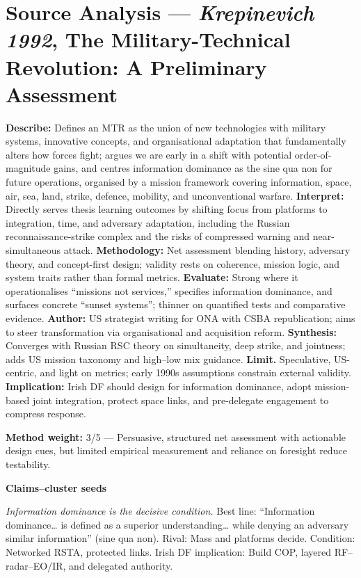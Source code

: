 \section*{Source Analysis — \textit{Krepinevich 1992}, The Military-Technical Revolution: A Preliminary Assessment}
\textbf{Describe:} Defines an MTR as the union of new technologies with military systems, innovative concepts, and organisational adaptation that fundamentally alters how forces fight; argues we are early in a shift with potential order-of-magnitude gains, and centres information dominance as the sine qua non for future operations, organised by a mission framework covering information, space, air, sea, land, strike, defence, mobility, and unconventional warfare.
\textbf{Interpret:} Directly serves thesis learning outcomes by shifting focus from platforms to integration, time, and adversary adaptation, including the Russian reconnaissance-strike complex and the risks of compressed warning and near-simultaneous attack.
\textbf{Methodology:} Net assessment blending history, adversary theory, and concept-first design; validity rests on coherence, mission logic, and system traits rather than formal metrics.
\textbf{Evaluate:} Strong where it operationalises “missions not services,” specifies information dominance, and surfaces concrete “sunset systems”; thinner on quantified tests and comparative evidence.
\textbf{Author:} US strategist writing for ONA with CSBA republication; aims to steer transformation via organisational and acquisition reform.
\textbf{Synthesis:} Converges with Russian RSC theory on simultaneity, deep strike, and jointness; adds US mission taxonomy and high–low mix guidance.
\textbf{Limit.} Speculative, US-centric, and light on metrics; early 1990s assumptions constrain external validity.
\textbf{Implication:} Irish DF should design for information dominance, adopt mission-based joint integration, protect space links, and pre-delegate engagement to compress response.

\textbf{Method weight:} 3/5 — Persuasive, structured net assessment with actionable design cues, but limited empirical measurement and reliance on foresight reduce testability.

\textbf{Claims–cluster seeds}

\textit{Information dominance is the decisive condition.} Best line: “Information dominance… is defined as a superior understanding… while denying an adversary similar information” (sine qua non). Rival: Mass and platforms decide. Condition: Networked RSTA, protected links. Irish DF implication: Build COP, layered RF–radar–EO/IR, and delegated authority.

